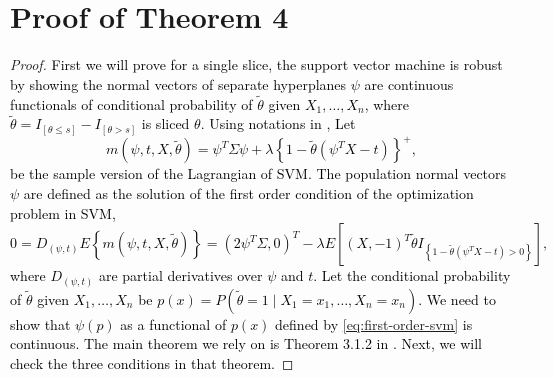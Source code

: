 \section{Proof of Theorem 4}\label{sec:Proof-of-Theorem-4}
\begin{proof}
\textcolor{black}{First we will prove for a single slice, the support
vector machine is robust by showing the normal vectors of separate
hyperplanes $\psi$ are continuous functionals of conditional probability
of $\tilde{\theta}$ given $X_{1},\ldots,X_{n}$, where $\tilde{\theta}=I_{\left[\theta\le s\right]}-I_{\left[\theta>s\right]}$
is sliced $\theta$. Using notations in \cite{li2011principal},
Let 
\[
m\left(\psi,t,X,\tilde{\theta}\right)=\psi^{T}\Sigma\psi+\lambda\left\{ 1-\tilde{\theta}\left(\psi^{T}X-t\right)\right\} ^{+},
\]
be the sample version of the Lagrangian of SVM. The population normal
vectors $\psi$ are defined as the solution of the first order condition
of the optimization problem in SVM,
\begin{equation}
0=D_{\left(\psi,t\right)}E\left\{ m\left(\psi,t,X,\tilde{\theta}\right)\right\} =\left(2\psi^{T}\Sigma,0\right)^{T}-\lambda E\left[\left(X,-1\right)^{T}\tilde{\theta}I_{\left\{ 1-\tilde{\theta}\left(\psi^{T}X-t\right)>0\right\} }\right],\label{eq:first-order-svm}
\end{equation}
where $D_{\left(\psi,t\right)}$ are partial derivatives over $\psi$
and $t$. Let the conditional probability of $\tilde{\theta}$ given
$X_{1},\ldots,X_{n}$ be $p\left(x\right)=P\left(\tilde{\theta}=1\mid X_{1}=x_{1},\ldots,X_{n}=x_{n}\right)$.
We need to show that $\psi\left(p\right)$ as a functional of $p\left(x\right)$
defined by \ref{eq:first-order-svm} is continuous. The main theorem
we rely on is Theorem 3.1.2 in \cite{lebedev2003functional}. Next,
we will check the three conditions in that theorem.}


\end{proof}
